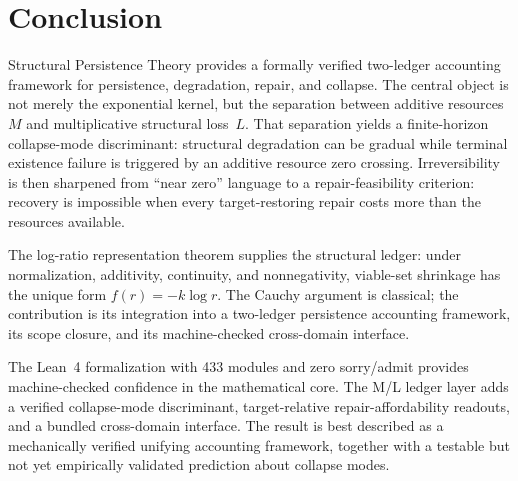 \documentclass[11pt,a4paper]{article}
\begin{document}
\section{Conclusion}

Structural Persistence Theory provides a formally verified two-ledger accounting framework for persistence, degradation, repair, and collapse. The central object is not merely the exponential kernel, but the separation between additive resources~$M$ and multiplicative structural loss~$L$. That separation yields a finite-horizon collapse-mode discriminant: structural degradation can be gradual while terminal existence failure is triggered by an additive resource zero crossing. Irreversibility is then sharpened from ``near zero'' language to a repair-feasibility criterion: recovery is impossible when every target-restoring repair costs more than the resources available.

The log-ratio representation theorem supplies the structural ledger: under normalization, additivity, continuity, and nonnegativity, viable-set shrinkage has the unique form $f(r)=-k\log r$. The Cauchy argument is classical; the contribution is its integration into a two-ledger persistence accounting framework, its scope closure, and its machine-checked cross-domain interface.

The Lean~4 formalization with 433 modules and zero sorry/admit provides machine-checked confidence in the mathematical core. The M/L ledger layer adds a verified collapse-mode discriminant, target-relative repair-affordability readouts, and a bundled cross-domain interface. The result is best described as a mechanically verified unifying accounting framework, together with a testable but not yet empirically validated prediction about collapse modes.
\end{document}
